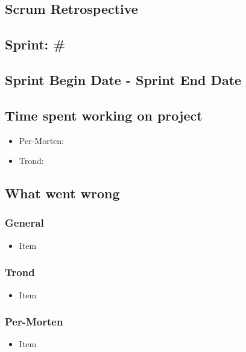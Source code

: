 \documentclass{article}
\begin{document}
\begin{center}
\section*{Scrum Retrospective}
\subsection*{Sprint: #}
\subsection*{Sprint Begin Date - Sprint End Date}
\end{center}
\bigskip

\subsection*{Time spent working on project}
\begin{itemize}
    \item
    Per-Morten: 

    \item
    Trond: 
\end{itemize}

\subsection*{What went wrong}
\subsubsection*{General}
\begin{itemize}
    \item
    Item
\end{itemize}

\subsubsection*{Trond}
\begin{itemize}
    \item 
    Item
\end{itemize}

\subsubsection*{Per-Morten}
\begin{itemize}
    \item
    Item
\end{itemize}
\end{document}
